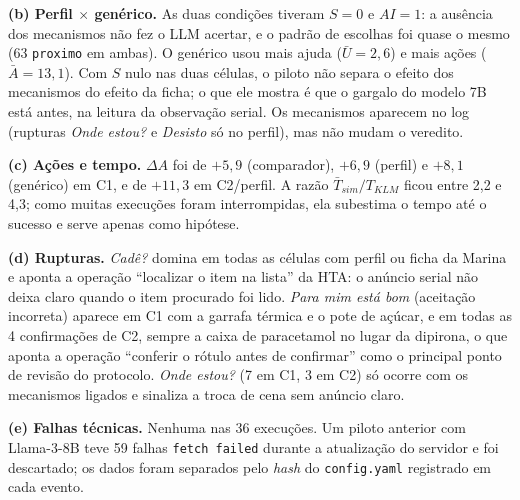 \documentclass[conference]{IEEEtran}
\begin{document}
\textbf{(b) Perfil $\times$ genérico.} As duas condições tiveram $S=0$ e $AI=1$: a ausência dos mecanismos não fez o LLM acertar, e o padrão de escolhas foi quase o mesmo (63 \texttt{proximo} em ambas). O genérico usou mais ajuda ($\bar U=2{,}6$) e mais ações ($\bar A=13{,}1$). Com $S$ nulo nas duas células, o piloto não separa o efeito dos mecanismos do efeito da ficha; o que ele mostra é que o gargalo do modelo 7B está antes, na leitura da observação serial. Os mecanismos aparecem no log (rupturas \emph{Onde estou?} e \emph{Desisto} só no perfil), mas não mudam o veredito.

\textbf{(c) Ações e tempo.} $\Delta A$ foi de $+5{,}9$ (comparador), $+6{,}9$ (perfil) e $+8{,}1$ (genérico) em C1, e de $+11{,}3$ em C2/perfil. A razão $\bar T_{sim}/T_{KLM}$ ficou entre 2{,}2 e 4{,}3; como muitas execuções foram interrompidas, ela subestima o tempo até o sucesso e serve apenas como hipótese.

\textbf{(d) Rupturas.} \emph{Cadê?} domina em todas as células com perfil ou ficha da Marina e aponta a operação ``localizar o item na lista'' da HTA: o anúncio serial não deixa claro quando o item procurado foi lido. \emph{Para mim está bom} (aceitação incorreta) aparece em C1 com a garrafa térmica e o pote de açúcar, e em todas as 4 confirmações de C2, sempre a caixa de paracetamol no lugar da dipirona, o que aponta a operação ``conferir o rótulo antes de confirmar'' como o principal ponto de revisão do protocolo. \emph{Onde estou?} (7 em C1, 3 em C2) só ocorre com os mecanismos ligados e sinaliza a troca de cena sem anúncio claro.

\textbf{(e) Falhas técnicas.} Nenhuma nas 36 execuções. Um piloto anterior com Llama-3-8B teve 59 falhas \texttt{fetch failed} durante a atualização do servidor e foi descartado; os dados foram separados pelo \emph{hash} do \texttt{config.yaml} registrado em cada evento.
\end{document}
